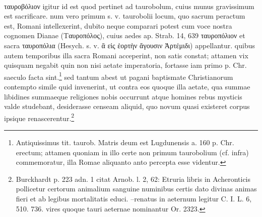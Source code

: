 \documentclass[a4paper, 11pt, oneside, polutonikogreek, german, twocolumn]{article}
\begin{document}
\paragraph{}
ταυροβόλιον igitur id est quod pertinet ad taurobolum, cuius munus gravissimum est sacrificare. num vero primum s. v. taurobolii locum, quo sacrum peractum est, Romani intellexerint, dubito neque comparari potest cum voce nostra cognomen Dianae (Ταυροπόλος), cuius aedes ap. Strab. 14, 639 ταυροπόλιον et sacra ταυροπόλια (Hesych. s. v. ἃ εἰς ἑορτὴν ἄγουσιν Ἀρτέμιδι) appellantur. quibus autem temporibus illa sacra Romani acceperint, non satis constat; attamen vix quisquam negabit quin non nisi aetate imperatoria, fortasse iam primo p. Chr. saeculo facta sint.\footnote{Antiquissimus tit. taurob. Matris deum est Lugdunensis a. 160 p. Chr. erectum; attamen quoniam in illo certe non primum taurobolium (cf. infra) commemoratur, illa Romae aliquanto anto percepta esse videntur.} sed tantum abest ut pagani baptismate Christianorum contempto simile quid invenerint, ut contra eos quoque illa aetate, qua summae libidines summaeque religiones nobis occurrunt atque homines rebus mysticis valde studebant, desiderasse censeam aliquid, quo novum quasi existeret corpus ipsique renascerentur.\footnote{Burckhardt p. 223 adn. 1 citat Arnob. l. 2, 62: Etruria libris in Acheronticis pollicetur certorum animalium sanguine numinibus certis dato divinas animas fieri et ab legibus mortalitatis educi. --renatus in aeternum legitur C. I. L. 6, 510. 736. vires quoque tauri aeternae nominantur Or. 2323.}
\end{document}

